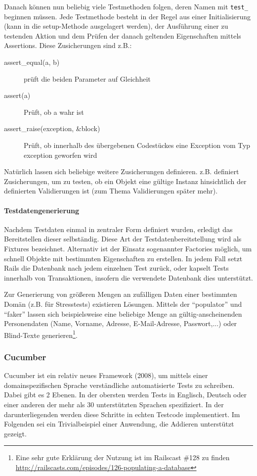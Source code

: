 Danach können nun beliebig viele Testmethoden folgen, deren Namen mit \texttt{test\_} beginnen müssen.
Jede Testmethode besteht in der Regel aus einer Initialisierung (kann in die setup-Methode ausgelagert werden), der Ausführung einer zu testenden Aktion und dem Prüfen der danach geltenden Eigenschaften mittels Assertions. Diese Zusicherungen sind z.B.:
\begin{description}
 \item[assert\_equal(a, b)] prüft die beiden Parameter auf Gleichheit
 \item[assert(a)] Prüft, ob a wahr ist
 \item[assert\_raise(exception, \&block)] Prüft, ob innerhalb des übergebenen Codestückes eine Exception vom Typ exception geworfen wird
\end{description}
Natürlich lassen sich beliebige weitere Zusicherungen definieren.  z.B. definiert Zusicherungen, um zu testen, ob ein Objekt eine gültige Instanz hinsichtlich der definierten Validierungen ist (zum Thema Validierungen später mehr).

\paragraph{Testdatengenerierung}
Nachdem Testdaten einmal in zentraler Form definiert wurden, erledigt  das Bereitstellen dieser selbständig. Diese Art der Testdatenbereitstellung wird als Fixtures bezeichnet. Alternativ ist der Einsatz sogenannter Factories möglich, um schnell Objekte mit bestimmten Eigenschaften zu erstellen. In jedem Fall setzt Rails die Datenbank nach jedem einzelnen Test zurück, oder kapselt Tests innerhalb von Transaktionen, insofern die verwendete Datenbank dies unterstützt.

Zur Generierung von größeren Mengen an zufälligen Daten einer bestimmten Domän (z.B. für Stresstests) existieren Lösungen. Mittels der  "`populator"' und "`faker"' lassen sich beispielsweise eine beliebige Menge an gültig-anscheinenden Personendaten (Name, Vorname, Adresse, E-Mail-Adresse, Passwort,...) oder Blind-Texte generieren\footnote{Eine sehr gute Erklärung der Nutzung ist im Railscast \#128 zu finden \url{http://railscasts.com/episodes/126-populating-a-database}}.


\subsubsection{Cucumber}
\label{sec:cucumber}
Cucumber ist ein relativ neues Framework (2008), um mittels einer domainspezifischen Sprache verständliche automatisierte Tests zu schreiben. Dabei gibt es 2 Ebenen. In der obersten werden Tests in Englisch, Deutsch oder einer anderen der mehr als 30 unterstützten Sprachen spezifiziert. In der darunterliegenden werden diese Schritte in echten Testcode implementiert. Im Folgenden sei ein Trivialbeispiel einer Anwendung, die Addieren unterstützt gezeigt.


